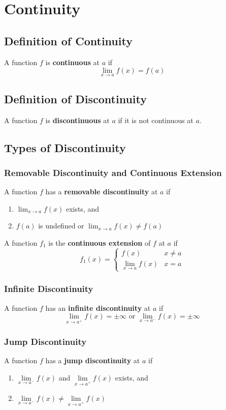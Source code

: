 \documentclass[../ma2002_notes.tex]{subfiles}
\begin{document}
\section{Continuity}
\subsection{Definition of Continuity}
A function \(f\) is \textbf{continuous} at \(a\) if
\[\lim_{x\to a}f(x)=f(a)\]

\subsection{Definition of Discontinuity}
A function \(f\) is \textbf{discontinuous} at \(a\) if it is not continuous at \(a\).

\subsection{Types of Discontinuity}
\subsubsection{Removable Discontinuity and Continuous Extension}
A function \(f\) has a \textbf{removable discontinuity} at \(a\) if
\begin{enumerate}
	\item \(\displaystyle\lim_{x\to a}f(x)\) exists, and
	\item \(f(a)\) is undefined or \(\displaystyle\lim_{x\to a}f(x)\ne f(a)\)
\end{enumerate}
A function \(f_1\) is the \textbf{continuous extension} of \(f\) at \(a\) if
\[f_1(x) =
\begin{cases}
	f(x) & x\ne a \\
	\lim \limits_{x\to a}f(x) & x=a
\end{cases}
\]

\subsubsection{Infinite Discontinuity}
A function \(f\) has an \textbf{infinite discontinuity} at \(a\) if
\[\lim_{x\to a^+}f(x)=\pm\infty\text{ or }\lim_{x\to a^-}f(x)=\pm\infty\]

\subsubsection{Jump Discontinuity}
A function \(f\) has a \textbf{jump discontinuity} at \(a\) if
\begin{enumerate}
	\item \(\lim\limits_{x\to a^-}f(x)\) and \(\lim\limits_{x\to a^+}f(x)\) exists, and
	\item \(\lim\limits_{x\to a^-}f(x)\ne\lim\limits_{x\to a^+}f(x)\)
\end{enumerate}
\end{document}
